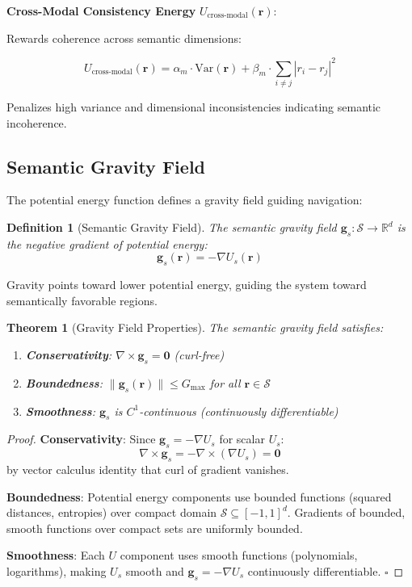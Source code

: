 \documentclass[12pt,a4paper]{article}
\newtheorem{theorem}{Theorem}
\newtheorem{definition}{Definition}
\begin{document}
\textbf{Cross-Modal Consistency Energy} $U_{\text{cross-modal}}(\mathbf{r})$:

Rewards coherence across semantic dimensions:

\begin{equation}
U_{\text{cross-modal}}(\mathbf{r}) = \alpha_m \cdot \text{Var}(\mathbf{r}) + \beta_m \cdot \sum_{i \neq j} |r_i - r_j|^2
\end{equation}

Penalizes high variance and dimensional inconsistencies indicating semantic incoherence.

\subsection{Semantic Gravity Field}

The potential energy function defines a gravity field guiding navigation:

\begin{definition}[Semantic Gravity Field]
The semantic gravity field $\mathbf{g}_s: \mathcal{S} \to \mathbb{R}^d$ is the negative gradient of potential energy:
\begin{equation}
\mathbf{g}_s(\mathbf{r}) = -\nabla U_s(\mathbf{r})
\end{equation}
\end{definition}

Gravity points toward lower potential energy, guiding the system toward semantically favorable regions.

\begin{theorem}[Gravity Field Properties]
The semantic gravity field satisfies:
\begin{enumerate}
\item \textbf{Conservativity}: $\nabla \times \mathbf{g}_s = \mathbf{0}$ (curl-free)
\item \textbf{Boundedness}: $\|\mathbf{g}_s(\mathbf{r})\| \leq G_{\max}$ for all $\mathbf{r} \in \mathcal{S}$
\item \textbf{Smoothness}: $\mathbf{g}_s$ is $C^1$-continuous (continuously differentiable)
\end{enumerate}
\end{theorem}

\begin{proof}
\textbf{Conservativity}: Since $\mathbf{g}_s = -\nabla U_s$ for scalar $U_s$:
\begin{equation}
\nabla \times \mathbf{g}_s = -\nabla \times (\nabla U_s) = \mathbf{0}
\end{equation}
by vector calculus identity that curl of gradient vanishes.

\textbf{Boundedness}: Potential energy components use bounded functions (squared distances, entropies) over compact domain $\mathcal{S} \subseteq [-1,1]^d$. Gradients of bounded, smooth functions over compact sets are uniformly bounded.

\textbf{Smoothness}: Each $U$ component uses smooth functions (polynomials, logarithms), making $U_s$ smooth and $\mathbf{g}_s = -\nabla U_s$ continuously differentiable. $\square$
\end{proof}
\end{document}
